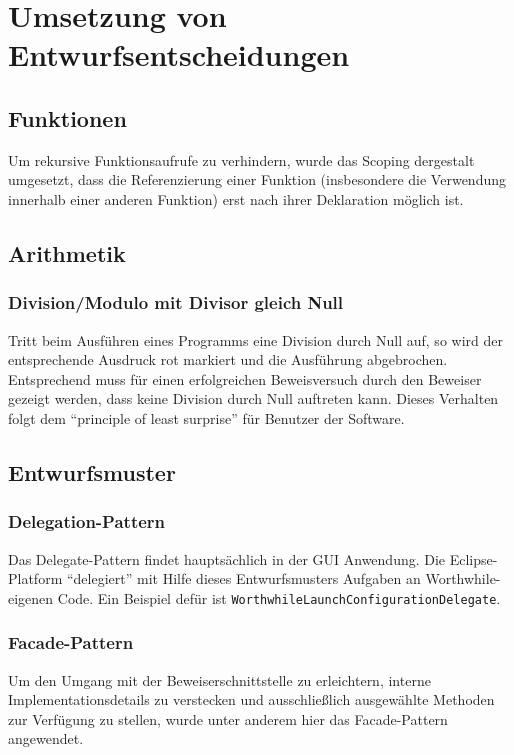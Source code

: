 \section{Umsetzung von Entwurfsentscheidungen}
\subsection{Funktionen}
Um rekursive Funktionsaufrufe zu verhindern, wurde das Scoping dergestalt umgesetzt, dass die Referenzierung einer Funktion (insbesondere die Verwendung innerhalb einer anderen Funktion) erst nach ihrer Deklaration möglich ist.

\subsection{Arithmetik}
\subsubsection{Division/Modulo mit Divisor gleich Null \label{umsetzung_division_null}}
Tritt beim Ausführen eines Programms eine Division durch Null auf, so wird der entsprechende Ausdruck rot markiert und die Ausführung abgebrochen. Entsprechend muss für einen erfolgreichen Beweisversuch durch den Beweiser gezeigt werden, dass keine Division durch Null auftreten kann. Dieses Verhalten folgt dem ``principle of least surprise'' für Benutzer der Software.

\subsection{Entwurfsmuster}
\subsubsection{Delegation-Pattern}
Das Delegate-Pattern findet hauptsächlich in der GUI Anwendung. Die Eclipse-Platform ``delegiert'' mit Hilfe dieses Entwurfsmusters Aufgaben an Worthwhile-eigenen Code. Ein Beispiel defür ist \texttt{WorthwhileLaunchConfigurationDelegate}.

\subsubsection{Facade-Pattern}
Um den Umgang mit der Beweiserschnittstelle zu erleichtern, interne Implementationsdetails zu verstecken und ausschließlich ausgewählte Methoden zur Verfügung zu stellen, wurde unter anderem hier das Facade-Pattern angewendet.

